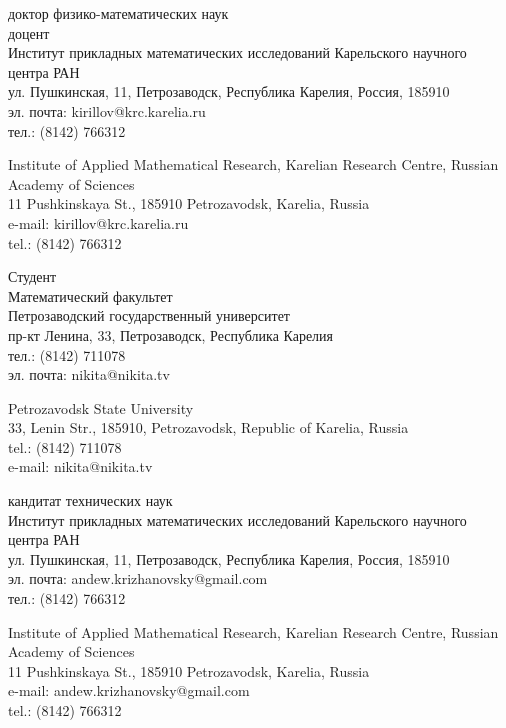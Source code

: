 \documentclass{article}
\begin{document}
\begin{aboutauthors}
доктор физико-математических наук\\ 
доцент\\
Институт прикладных математических исследований Карельского научного центра РАН\\ 
ул. Пушкинская, 11, Петрозаводск, Республика Карелия, Россия, 185910\\
эл. почта: kirillov@krc.karelia.ru\\
тел.: (8142) 766312

\columnbreak

Institute of Applied Mathematical Research, Karelian Research Centre, Russian Academy of Sciences\\
11 Pushkinskaya St., 185910 Petrozavodsk, Karelia, Russia\\
e-mail: kirillov@krc.karelia.ru\\
tel.: (8142) 766312
\end{aboutauthors}

\begin{aboutauthors}
Студент\\
Математический факультет\\ 
Петрозаводский государственный университет\\
пр-кт Ленина, 33, Петрозаводск, Республика Карелия\\
тел.: (8142) 711078\\
эл. почта: nikita@nikita.tv

\columnbreak

Petrozavodsk State University\\
33, Lenin Str., 185910, Petrozavodsk, Republic of Karelia, Russia\\
tel.: (8142) 711078\\
e-mail: nikita@nikita.tv 
\end{aboutauthors}

\begin{aboutauthors}
кандитат технических наук\\ 
Институт прикладных математических исследований Карельского научного центра РАН\\ 
ул. Пушкинская, 11, Петрозаводск, Республика Карелия, Россия, 185910\\
эл. почта: andew.krizhanovsky@gmail.com\\
тел.: (8142) 766312

\columnbreak

Institute of Applied Mathematical Research, Karelian Research Centre, Russian Academy of Sciences\\
11 Pushkinskaya St., 185910 Petrozavodsk, Karelia, Russia\\
e-mail: andew.krizhanovsky@gmail.com\\
tel.: (8142) 766312
\end{aboutauthors}
\end{document}
